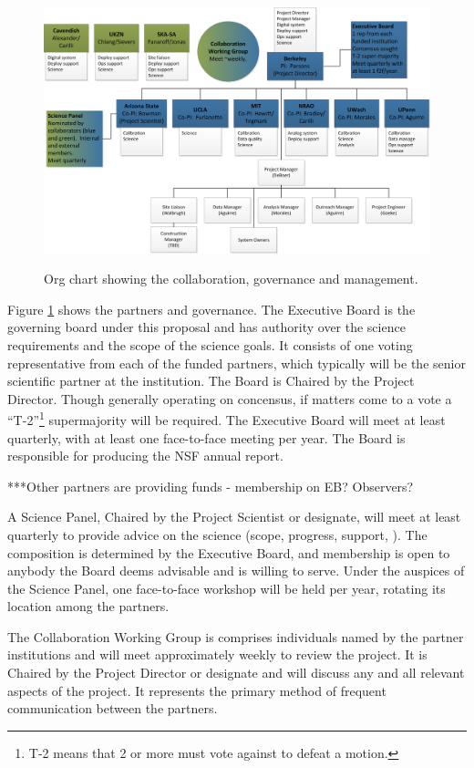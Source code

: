 \documentclass[preprint]{aastex}
\begin{document}
\begin{figure}[h]
\centering
\includegraphics[width=\textwidth]{plots/org.png}
\label{fig:org}
\caption{Org chart showing the collaboration, governance and management.}
\end{figure}

Figure \ref{fig:org} shows the partners and governance. The Executive Board is the
governing board under this proposal and has authority over the science requirements
and the scope of the science goals. It consists of one voting representative from
each of the funded partners, which typically will be the senior scientific partner at
the institution. The Board is Chaired by the Project Director. Though generally
operating on concensus, if matters come to a vote a ``T-2''\footnote{T-2 means that 2
or more must vote against to defeat a motion.} supermajority will be required. The
Executive Board will meet at least quarterly, with at least one face-to-face meeting
per year. The Board is responsible for producing the NSF annual report.

***Other partners are providing funds - membership on EB?  Observers?

A Science Panel, Chaired by the Project Scientist or designate, will meet at least
quarterly to provide advice on the science (scope, progress, support, ). The
composition is determined by the Executive Board, and membership is open to anybody
the Board deems advisable and is willing to serve. Under the auspices of the Science
Panel, one face-to-face workshop will be held per year, rotating its location among
the partners.

The Collaboration Working Group is comprises individuals named by the partner
institutions and will meet approximately weekly to review the project. It is Chaired
by the Project Director or designate and will discuss any and all relevant aspects of
the project. It represents the primary method of frequent communication between the
partners.
\end{document}
